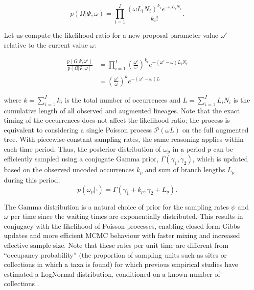 \documentclass[oupdraft]{sysbio}
\newcommand{\revised}[1]{{\color{blue} #1}}
\begin{document}
\begin{equation}\label{eq:ll_occ}
    p(\Omega|\Psi, \omega) = \prod_{i=1}^I \frac{(\omega L_i N_i)^{k_i}e^{-\omega L_i N_i}}{k_i!}.
\end{equation}

Let us compute the likelihood ratio for a new proposal parameter value $\omega'$ relative to the current value $\omega$:

\begin{align*}\label{eq:ll_ratio}
\frac{p(\Omega|\Psi, \omega')}{p(\Omega|\Psi, \omega)} &= \prod_{i=1}^I \left(\frac{\omega'}{\omega}\right)^{k_i}e^{-(\omega'-\omega) L_i N_i}\\
&= \left(\frac{\omega'}{\omega}\right)^{k}e^{-(\omega'-\omega) L}
\end{align*}


where $k = \sum_{i=1}^I k_i$ is the total number of occurrences and $L = \sum_{i=1}^I L_i N_i$ is the cumulative length of all observed and augmented lineages. Note that the exact timing of the occurrences does not affect the likelihood ratio; the process is equivalent to considering a single Poisson process $\mathcal P(\omega L)$ on the full augmented tree. With piecewise-constant sampling rates, the same reasoning applies within each time period. Thus, the posterior distribution of $\omega_p$ in a period $p$ can be efficiently sampled using a conjugate Gamma prior, $\Gamma(\gamma_1, \gamma_2)$, which is updated based on the observed \revised{uncoded} occurrences $k_p$ and sum of branch lengths $L_p$ during this period:
\begin{equation*}
p(\omega_p| \cdot) = \Gamma(\gamma_1 + k_p, \gamma_2 + L_p).
\end{equation*}

\revised{The Gamma distribution is a natural choice of prior for the sampling rates $\psi$ and $\omega$ per time since the waiting times are exponentially distributed. This results in conjugacy with the likelihood of Poisson processes, enabling closed-form Gibbs updates and more efficient MCMC behaviour with faster mixing and increased effective sample size. Note that these rates per unit time are different from ``occupancy probability'' (the proportion of sampling units such as sites or collections in which a taxa is found) \citep{foote_measurement_2016} for which previous empirical studies have estimated a LogNormal distribution, conditioned on a known number of collections \citep{wagner_modelling_2013, foote_measurement_2016}.}
\end{document}
